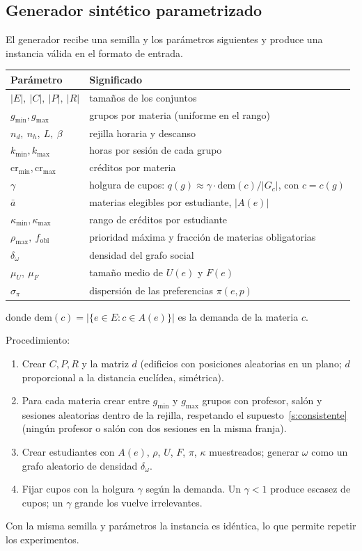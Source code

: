 \documentclass[11pt,letterpaper]{article}
\theoremstyle{definition}
\theoremstyle{remark}
\theoremstyle{plain}
\newcommand{\card}[1]{\lvert #1 \rvert}
\begin{document}
\subsection{Generador sintético parametrizado}
El generador recibe una semilla y los parámetros siguientes y produce una
instancia válida en el formato de entrada.
\begin{center}
\small
\begin{tabular}{ll}
\toprule
Parámetro & Significado \\
\midrule
$\card{E},\ \card{C},\ \card{P},\ \card{R}$ & tamaños de los conjuntos \\
$g_{\min},g_{\max}$ & grupos por materia (uniforme en el rango) \\
$n_d,\ n_h,\ L,\ \beta$ & rejilla horaria y descanso \\
$k_{\min},k_{\max}$ & horas por sesión de cada grupo \\
$\mathrm{cr}_{\min},\mathrm{cr}_{\max}$ & créditos por materia \\
$\gamma$ & holgura de cupos: $q(g)\approx\gamma\cdot\mathrm{dem}(c)/\card{G_c}$, con $c=c(g)$ \\
$\bar a$ & materias elegibles por estudiante, $\card{A(e)}$ \\
$\kappa_{\min},\kappa_{\max}$ & rango de créditos por estudiante \\
$\rho_{\max},\ f_{\mathrm{obl}}$ & prioridad máxima y fracción de materias obligatorias \\
$\delta_\omega$ & densidad del grafo social \\
$\mu_U,\ \mu_F$ & tamaño medio de $U(e)$ y $F(e)$ \\
$\sigma_\pi$ & dispersión de las preferencias $\pi(e,p)$ \\
\bottomrule
\end{tabular}
\end{center}
donde $\mathrm{dem}(c)=\card{\{e\in E : c\in A(e)\}}$ es la demanda de la
materia $c$.

Procedimiento:
\begin{enumerate}[nosep]
  \item Crear $C,P,R$ y la matriz $d$ (edificios con posiciones aleatorias en
        un plano; $d$ proporcional a la distancia euclídea, simétrica).
  \item Para cada materia crear entre $g_{\min}$ y $g_{\max}$ grupos con
        profesor, salón y sesiones aleatorias dentro de la rejilla, respetando
        el supuesto~\ref{s:consistente} (ningún profesor o salón con dos
        sesiones en la misma franja).
  \item Crear estudiantes con $A(e)$, $\rho$, $U$, $F$, $\pi$, $\kappa$
        muestreados; generar $\omega$ como un grafo aleatorio de densidad
        $\delta_\omega$.
  \item Fijar cupos con la holgura $\gamma$ según la demanda. Un $\gamma<1$
        produce escasez de cupos; un $\gamma$ grande los vuelve irrelevantes.
\end{enumerate}
Con la misma semilla y parámetros la instancia es idéntica, lo que permite
repetir los experimentos.
\end{document}
